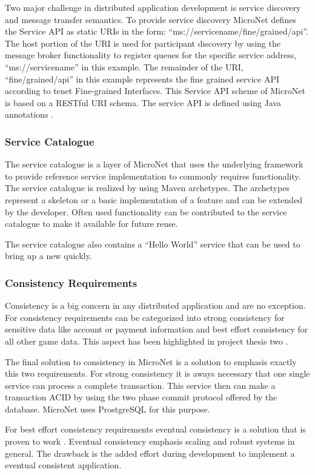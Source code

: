 Two major challenge in distributed application development is service discovery
and message transfer semantics. To provide service discovery MicroNet defines
the Service API as static URIs in the form:
``ms://servicename/fine/grained/api''. The host portion of the URI is used for
participant discovery by using the message broker functionality to register
queues for the specific service address, ``ms://servicename'' in this example.
The remainder of the URI, ``fine/grained/api'' in this example represents the
fine grained service API according to tenet Fine-grained Interfaces. This
Service API scheme of MicroNet is based on a RESTful URI schema. The service API
is defined using Java annotations .

\subsubsection{Service Catalogue}

The service catalogue is a layer of MicroNet that uses the underlying framework
to provide reference service implementation to commonly requires functionality.
The service catalogue is realized by using Maven archetypes. The archetypes
represent a skeleton or a basic implementation of a feature and can be extended
by the developer. Often used functionality can be contributed to the service
catalogue to make it available for future reuse.

The service catalogue also contains a ``Hello World'' service that can be used
to bring up a new \ms{} quickly.

\subsubsection{Consistency Requirements}

Consistency is a big concern in any distributed application and \ogs{} are no
exception. For \ogs{} consistency requirements can be categorized into strong
consistency for sensitive data like account or payment information and best
effort consistency for all other game data. This aspect has been highlighted in
project thesis two .

The final solution to consistency in MicroNet is a solution to emphasis
exactly this two requirements. For strong consistency it is aways necessary that
one single service can process a complete transaction. This service then can
make a transaction ACID by using the two phase commit protocol offered by the
database. MicroNet uses ProstgreSQL for this purpose.

For best effort consistency requirements eventual consistency is a solution that
is proven to work \cite{graham2016distributed_transactions}. Eventual
consistency emphasis scaling and robust systems in general. The drawback is the
added effort during development to implement a eventual consistent application.
